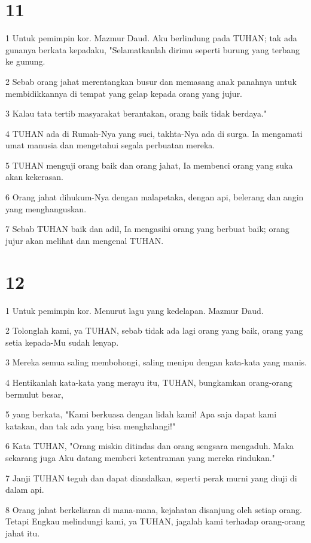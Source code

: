 \chapter{11}

\par 1 Untuk pemimpin kor. Mazmur Daud. Aku berlindung pada TUHAN; tak ada gunanya berkata kepadaku, "Selamatkanlah dirimu seperti burung yang terbang ke gunung.
\par 2 Sebab orang jahat merentangkan busur dan memasang anak panahnya untuk membidikkannya di tempat yang gelap kepada orang yang jujur.
\par 3 Kalau tata tertib masyarakat berantakan, orang baik tidak berdaya."
\par 4 TUHAN ada di Rumah-Nya yang suci, takhta-Nya ada di surga. Ia mengamati umat manusia dan mengetahui segala perbuatan mereka.
\par 5 TUHAN menguji orang baik dan orang jahat, Ia membenci orang yang suka akan kekerasan.
\par 6 Orang jahat dihukum-Nya dengan malapetaka, dengan api, belerang dan angin yang menghanguskan.
\par 7 Sebab TUHAN baik dan adil, Ia mengasihi orang yang berbuat baik; orang jujur akan melihat dan mengenal TUHAN.

\chapter{12}

\par 1 Untuk pemimpin kor. Menurut lagu yang kedelapan. Mazmur Daud.
\par 2 Tolonglah kami, ya TUHAN, sebab tidak ada lagi orang yang baik, orang yang setia kepada-Mu sudah lenyap.
\par 3 Mereka semua saling membohongi, saling menipu dengan kata-kata yang manis.
\par 4 Hentikanlah kata-kata yang merayu itu, TUHAN, bungkamkan orang-orang bermulut besar,
\par 5 yang berkata, "Kami berkuasa dengan lidah kami! Apa saja dapat kami katakan, dan tak ada yang bisa menghalangi!"
\par 6 Kata TUHAN, "Orang miskin ditindas dan orang sengsara mengaduh. Maka sekarang juga Aku datang memberi ketentraman yang mereka rindukan."
\par 7 Janji TUHAN teguh dan dapat diandalkan, seperti perak murni yang diuji di dalam api.
\par 8 Orang jahat berkeliaran di mana-mana, kejahatan disanjung oleh setiap orang. Tetapi Engkau melindungi kami, ya TUHAN, jagalah kami terhadap orang-orang jahat itu.

